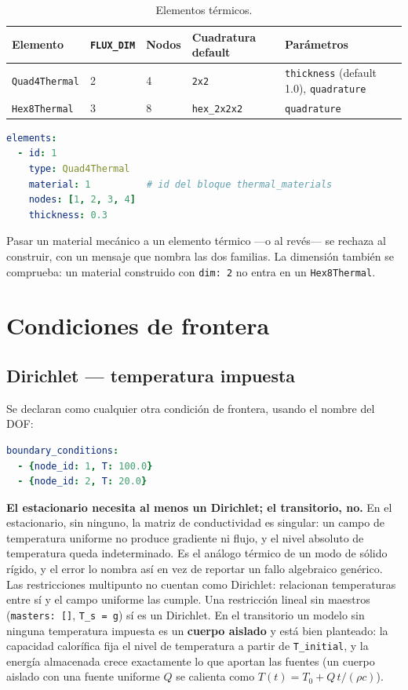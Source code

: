 \documentclass[11pt,oneside]{report}
\begin{document}
\begin{table}[h]
\centering
\caption{Elementos térmicos.}
\begin{tabularx}{\textwidth}{YYYYY}
\hline
\textbf{Elemento} & \textbf{\texttt{FLUX\_DIM}} & \textbf{Nodos} & \textbf{Cuadratura default} & \textbf{Parámetros} \\
\hline
\texttt{Quad4Thermal} & 2 & 4 & \texttt{2x2} & \texttt{thickness} (default 1.0), \texttt{quadrature} \\
\texttt{Hex8Thermal} & 3 & 8 & \texttt{hex\_2x2x2} & \texttt{quadrature} \\
\hline
\end{tabularx}
\end{table}
\begin{lstlisting}[language=yaml]
elements:
  - id: 1
    type: Quad4Thermal
    material: 1          # id del bloque thermal_materials
    nodes: [1, 2, 3, 4]
    thickness: 0.3

\end{lstlisting}

Pasar un material mecánico a un elemento térmico ---o al revés--- se rechaza al construir, con un mensaje que nombra las dos familias. La dimensión también se comprueba: un material construido con \texttt{dim: 2} no entra en un \texttt{Hex8Thermal}.

\section{Condiciones de frontera}

\subsection{Dirichlet --- temperatura impuesta}

Se declaran como cualquier otra condición de frontera, usando el nombre del DOF:

\begin{lstlisting}[language=yaml]
boundary_conditions:
  - {node_id: 1, T: 100.0}
  - {node_id: 2, T: 20.0}

\end{lstlisting}

\textbf{El estacionario necesita al menos un Dirichlet; el transitorio, no.} En el estacionario, sin ninguno, la matriz de conductividad es singular: un campo de temperatura uniforme no produce gradiente ni flujo, y el nivel absoluto de temperatura queda indeterminado. Es el análogo térmico de un modo de sólido rígido, y el error lo nombra así en vez de reportar un fallo algebraico genérico. Las restricciones multipunto no cuentan como Dirichlet: relacionan temperaturas entre sí y el campo uniforme las cumple. Una restricción lineal sin maestros (\texttt{masters: []}, \texttt{T\_s = g}) sí es un Dirichlet. En el transitorio un modelo sin ninguna temperatura impuesta es un \textbf{cuerpo aislado} y está bien planteado: la capacidad calorífica fija el nivel de temperatura a partir de \texttt{T\_initial}, y la energía almacenada crece exactamente lo que aportan las fuentes (un cuerpo aislado con una fuente uniforme $Q$ se calienta como $T(t) = T_0 + Q\,t/(\rho c)$).
\end{document}

